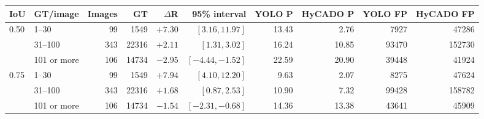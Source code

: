 \begin{tabular}{llrrrrrrrr}
\toprule
IoU & GT/image & Images & GT & $\Delta$R & 95\% interval & YOLO P & HyCADO P & YOLO FP & HyCADO FP\\
\midrule
0.50 & 1--30 & 99 & 1549 & $+7.30$ & $[3.16, 11.97]$ & 13.43 & 2.76 & 7927 & 47286\\
 & 31--100 & 343 & 22316 & $+2.11$ & $[1.31, 3.02]$ & 16.24 & 10.85 & 93470 & 152730\\
 & 101 or more & 106 & 14734 & $-2.95$ & $[-4.44, -1.52]$ & 22.59 & 20.90 & 39448 & 41924\\
0.75 & 1--30 & 99 & 1549 & $+7.94$ & $[4.10, 12.20]$ & 9.63 & 2.07 & 8275 & 47624\\
 & 31--100 & 343 & 22316 & $+1.68$ & $[0.87, 2.53]$ & 10.90 & 7.32 & 99428 & 158782\\
 & 101 or more & 106 & 14734 & $-1.54$ & $[-2.31, -0.68]$ & 14.36 & 13.38 & 43641 & 45909\\
\bottomrule
\end{tabular}
